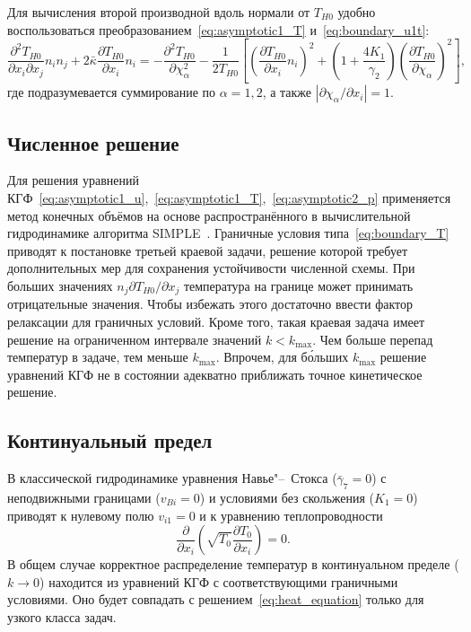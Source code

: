 \documentclass[
aps,%
12pt,%
final,%
notitlepage,%
oneside,%
onecolumn,%
nobibnotes,%
nofootinbib,%
superscriptaddress,%
noshowpacs,%
showkeys,%
centertags]%
{revtex4}
\newcommand{\pder}[2][]{\frac{\partial#1}{\partial#2}}
\newcommand{\pderdual}[2][]{\frac{\partial^2#1}{\partial#2^2}}
\newcommand{\pderder}[3][]{\frac{\partial^2#1}{\partial#2\partial#3}}
\newcommand{\Pder}[2][]{\partial#1/\partial#2}
\begin{document}
Для вычисления второй производной вдоль нормали от \(T_{H0}\)
удобно воспользоваться преобразованием~\eqref{eq:asymptotic1_T} и~\eqref{eq:boundary_u1t}:
\begin{equation}\label{eq:Tnn}
    \pderder[T_{H0}]{x_i}{x_j}n_i n_j + 2\bar\kappa\pder[T_{H0}]{x_i}n_i =
    - \pderdual[T_{H0}]{\chi_\alpha} - \frac1{2T_{H0}} \left[
        \left(\pder[T_{H0}]{x_i}n_i\right)^2 +
        \left(1+\frac{4K_1}{\gamma_2}\right) \left(\pder[T_{H0}]{\chi_\alpha}\right)^2
    \right],
\end{equation}
где подразумевается суммирование по \(\alpha=1,2\), а также \(|\Pder[\chi_\alpha]{x_i}| = 1\).

\subsection{Численное решение}

Для решения уравнений КГФ~\eqref{eq:asymptotic1_u},~\eqref{eq:asymptotic1_T},~\eqref{eq:asymptotic2_p}
применяется метод конечных объёмов на основе распространённого в вычислительной гидродинамике алгоритма SIMPLE~\cite{Aoki2007}.
Граничные условия типа~\eqref{eq:boundary_T} приводят к постановке третьей краевой задачи,
решение которой требует дополнительных мер для сохранения устойчивости численной схемы.
При больших значениях \(n_j\Pder[T_{H0}]{x_j}\) температура на границе может принимать отрицательные значения.
Чтобы избежать этого достаточно ввести фактор релаксации для граничных условий.
Кроме того, такая краевая задача имеет решение на ограниченном интервале значений \(k<k_{\max}\).
Чем больше перепад температур в задаче, тем меньше \(k_{\max}\).
Впрочем, для б\'{о}льших \(k_{\max}\) решение уравнений КГФ не в состоянии адекватно приближать
точное кинетическое решение.

\subsection{Континуальный предел}

В классической гидродинамике уравнения Навье"--~Стокса (\(\bar{\gamma}_7=0\))
с неподвижными границами (\(v_{Bi}=0\)) и условиями без скольжения (\(K_1=0\))
приводят к нулевому полю \(v_{i1}=0\) и к уравнению теплопроводности
\begin{equation}\label{eq:heat_equation}
    \pder{x_i}\left(\sqrt{T_0}\pder[T_0]{x_i}\right) = 0.
\end{equation}
В общем случае корректное распределение температур в континуальном пределе (\(k\to0\))
находится из уравнений КГФ с соответствующими граничными условиями.
Оно будет совпадать с решением~\eqref{eq:heat_equation} только для узкого класса задач.
\end{document}
